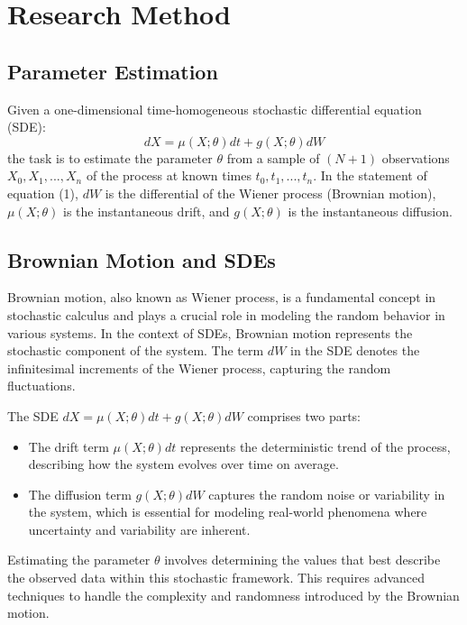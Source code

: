\section*{Research Method}

\subsection*{Parameter Estimation}
Given a one-dimensional time-homogeneous stochastic differential equation (SDE):
\begin{equation}
    dX = \mu(X;\theta)dt + g(X;\theta)dW
\end{equation}
the task is to estimate the parameter $\theta$ from a sample of $(N+1)$ observations $X_0, X_1, ..., X_n$ of the process at 
known times $t_0, t_1, ..., t_n$. In the statement of equation (1), $dW$ is the differential of the Wiener process 
(Brownian motion), $\mu(X;\theta)$ is the instantaneous drift, and $g(X;\theta)$ is the instantaneous diffusion.

\subsection*{Brownian Motion and SDEs}
Brownian motion, also known as Wiener process, is a fundamental concept in stochastic calculus and plays a crucial role in modeling the random behavior in various systems. In the context of SDEs, Brownian motion represents the stochastic component of the system. The term $dW$ in the SDE denotes the infinitesimal increments of the Wiener process, capturing the random fluctuations.

The SDE $dX = \mu(X;\theta)dt + g(X;\theta)dW$ comprises two parts:
\begin{itemize}
    \item The drift term $\mu(X;\theta)dt$ represents the deterministic trend of the process, describing how the system evolves over time on average.
    \item The diffusion term $g(X;\theta)dW$ captures the random noise or variability in the system, which is essential for modeling real-world phenomena where uncertainty and variability are inherent.
\end{itemize}

Estimating the parameter $\theta$ involves determining the values that best describe the observed data within this stochastic framework. This requires advanced techniques to handle the complexity and randomness introduced by the Brownian motion.

